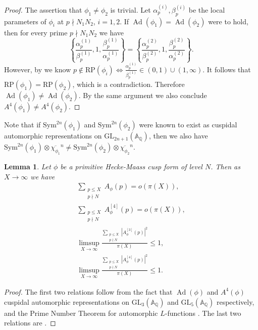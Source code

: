 \documentclass[10pt,leqno]{amsart}
\theoremstyle{plain}
\newtheorem{lemma}{Lemma}
\theoremstyle{definition}
\theoremstyle{remark}
\numberwithin{equation}{section}
\newcommand{\Ad}{\operatorname{Ad}}
\newcommand{\RP}{\text{RP}}
\newcommand{\Sym}{\text{Sym}}
\newcommand{\GL}{\text{GL}}
\newcommand{\bA}{\mathbb{A}}
\newcommand{\bQ}{\mathbb{Q}}
\begin{document}
\begin{proof}
    The assertion that $\phi_1 \neq \phi_2$ is trivial. Let $\alpha_p^{(i)},\beta_p^{(i)}$ be the local parameters of $\phi_i$ at $p\nmid N_1N_2$, $i=1,2$. If $\Ad(\phi_1) = \Ad(\phi_2)$ were to hold, then for every prime $p\nmid N_1N_2$ we have 
    $$\left\{\frac{\alpha_p^{(1)}}{\beta_p^{(1)}},1,\frac{\beta_p^{(1)}}{\alpha_p^{(1)}}\right\} = \left\{\frac{\alpha_p^{(2)}}{\beta_p^{(2)}},1,\frac{\beta_p^{(2)}}{\alpha_p^{(2)}}\right\}.$$
    However, by \cite[Lemma 2.1]{LuoZhouMR3928043} we know $p \notin \RP(\phi_i) \Leftrightarrow \frac{\alpha_p^{(1)}}{\beta_p^{(1)}} \in (0,1) \cup (1,\infty)$. It follows that $\RP(\phi_1) = \RP(\phi_2)$, which is a contradiction. Therefore $\Ad(\phi_1) \neq \Ad(\phi_2)$. By the same argument we also conclude $A^4(\phi_1) \neq A^4(\phi_2)$.
\end{proof}

Note that if $\Sym^{2n}(\phi_1)$ and $\Sym^{2n}(\phi_2)$ were known to exist as cuspidal automorphic representations on $\GL_{2n+1}(\mathbb{A}_\mathbb{Q})$, then we also have $\Sym^{2n}(\phi_1) \otimes \overline{\chi_{\phi_1}}^n \neq \Sym^{2n}(\phi_2) \otimes \overline{\chi_{\phi_2}}^n$. 

\begin{lemma}\label{prime number theorem cusp form}
    Let $\phi$ be a primitive Hecke-Maass cusp form of level $N$. Then as $X \to \infty$ we have 
    \begin{align*}
        \sum_{\substack{p \leq X \\ p\nmid N}} A_{\phi}(p) = o(\pi(X)), \\
        \sum_{\substack{p \leq X \\ p\nmid N}} A^{[4]}_{\phi}(p) = o(\pi(X)), \\
        \limsup_{X \to \infty} \frac{\sum_{\substack{p \leq X \\ p\nmid N}} |A^{[3]}_{\phi}(p)|^2}{\pi(X)} \leq 1, \\
        \limsup_{X \to \infty} \frac{\sum_{\substack{p \leq X \\ p\nmid N}} |A^{[4]}_{\phi}(p)|^2}{\pi(X)} \leq 1.
    \end{align*}
\end{lemma}

\begin{proof}
    The first two relations follow from the fact that $\Ad(\phi)$ and $A^4(\phi)$ cuspidal automorphic representations on $\GL_3(\bA_\bQ)$ and $\GL_5(\bA_\bQ)$ respectively, and the Prime Number Theorem for automorphic $L$-functions \cite[Theorem 5.13]{IwaniecKowalskiMR2061214}. The last two relations are \cite[Remark 3.3]{LuoZhouMR3928043}.
\end{proof}
\end{document}
